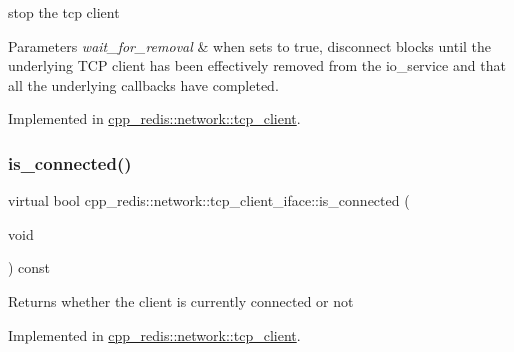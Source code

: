 stop the tcp client


\begin{DoxyParams}{Parameters}
{\em wait\+\_\+for\+\_\+removal} & when sets to true, disconnect blocks until the underlying T\+CP client has been effectively removed from the io\+\_\+service and that all the underlying callbacks have completed. \\
\hline
\end{DoxyParams}


Implemented in \mbox{\hyperlink{classcpp__redis_1_1network_1_1tcp__client_a88f49c4e32d59855a62296fb74136a44}{cpp\+\_\+redis\+::network\+::tcp\+\_\+client}}.

\mbox{\label{classcpp__redis_1_1network_1_1tcp__client__iface_a41ad0b43e3ab172828a3d2ce55d23893}} 
\subsubsection{\texorpdfstring{is\+\_\+connected()}{is\_connected()}}
{\footnotesize\ttfamily virtual bool cpp\+\_\+redis\+::network\+::tcp\+\_\+client\+\_\+iface\+::is\+\_\+connected (\begin{DoxyParamCaption}\item[{void}]{ }\end{DoxyParamCaption}) const\hspace{0.3cm}{\ttfamily [pure virtual]}}

\begin{DoxyReturn}{Returns}
whether the client is currently connected or not 
\end{DoxyReturn}


Implemented in \mbox{\hyperlink{classcpp__redis_1_1network_1_1tcp__client_a0a636ca6bd59425bf22416a1c7694f65}{cpp\+\_\+redis\+::network\+::tcp\+\_\+client}}.

\mbox{\label{classcpp__redis_1_1network_1_1tcp__client__iface_acecf3b75c3849071d82478bc7a8c97a8}} 

